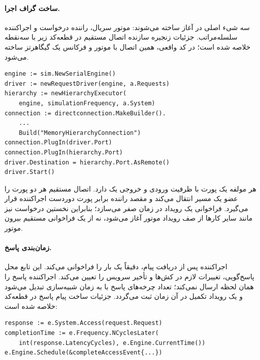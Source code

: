 \documentclass[oneside,a4paper,12pt]{article}
\newcommand{\مهم}[1]{\textbf{#1}}
\newcommand{\درصد}[1]{\lr{#1\%}}
\begin{document}
\paragraph{ساخت گراف اجرا.}
سه شیء اصلی در آغاز ساخته می‌شوند: موتور سریال، راننده درخواست و اجراکننده سلسله‌مراتب. جزئیات زنجیره سازنده اتصال مستقیم در قطعه‌کد زیر با سه‌نقطه خلاصه شده است؛ در کد واقعی، همین اتصال با موتور و فرکانس یک گیگاهرتز ساخته می‌شود.

\begin{latin}
\begin{lstlisting}[caption={\lr{Core steps of Akita graph construction}}]
engine := sim.NewSerialEngine()
driver := newRequestDriver(engine, a.Requests)
hierarchy := newHierarchyExecutor(
    engine, simulationFrequency, a.System)
connection := directconnection.MakeBuilder().
    ...
    Build("MemoryHierarchyConnection")
connection.PlugIn(driver.Port)
connection.PlugIn(hierarchy.Port)
driver.Destination = hierarchy.Port.AsRemote()
driver.Start()
\end{lstlisting}
\end{latin}

هر مولفه یک پورت با ظرفیت ورودی و خروجی یک دارد. اتصال مستقیم هر دو پورت را عضو یک مسیر انتقال می‌کند و مقصد راننده برابر پورت دوردست اجراکننده قرار می‌گیرد. فراخوانی  یک رویداد در زمان صفر می‌سازد؛ بنابراین نخستین درخواست نیز مانند سایر کارها از صف رویداد موتور آغاز می‌شود، نه از یک فراخوانی مستقیم بیرون موتور.

\paragraph{زمان‌بندی پاسخ.}
اجراکننده پس از دریافت پیام، دقیقاً یک بار  را فراخوانی می‌کند. این تابع محل پاسخ‌گویی، تغییرات لازم در کش‌ها و تأخیر سرویس را تعیین می‌کند. اجراکننده پاسخ را همان لحظه ارسال نمی‌کند؛ تعداد چرخه‌های پاسخ با  به زمان شبیه‌سازی تبدیل می‌شود و یک رویداد تکمیل در آن زمان ثبت می‌گردد. جزئیات ساخت پیام پاسخ در قطعه‌کد خلاصه شده است:

\begin{latin}
\begin{lstlisting}[caption={\lr{Core of response-completion scheduling}}]
response := e.System.Access(request.Request)
completionTime := e.Frequency.NCyclesLater(
    int(response.LatencyCycles), e.Engine.CurrentTime())
e.Engine.Schedule(&completeAccessEvent{...})
\end{lstlisting}
\end{latin}
\end{document}
